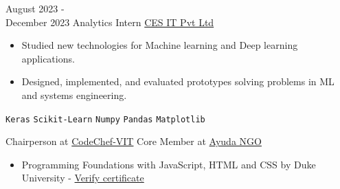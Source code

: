 \documentclass[9pt]{developercv}
\begin{document}
\vspace{-10 pt}
\begin{entrylist}
	\entry
        {August 2023 - \\
        December 2023}
		{Analytics Intern}
		{\href{https://www.cesltd.com/}{CES IT Pvt Ltd}}
		{\vspace{-10pt}
        \begin{itemize}[noitemsep,topsep=0pt,parsep=0pt,partopsep=0pt, leftmargin=-1pt]
            \item {Studied new technologies for Machine learning and Deep learning applications.}
            \item {Designed, implemented, and evaluated prototypes solving problems in ML and systems engineering.}
        \end{itemize} 
        \texttt{Keras} \slashsep \texttt{Scikit-Learn} \slashsep \texttt{Numpy} \slashsep \texttt{Pandas} \slashsep \texttt{Matplotlib}}
\end{entrylist}
\vspace{-10 pt}
    \vspace{-6pt}
    
    \hspace{26mm} Chairperson at \href{https://codechefvit.com/}{CodeChef-VIT} \hspace{20mm}Core Member at \href{https://ngoayuda.org/}{Ayuda NGO}


\vspace{5 pt}
    \vspace{-6pt}
    
    \begin{itemize}[noitemsep,topsep=0pt,parsep=0pt,partopsep=0pt, leftmargin=75pt]
            \item Programming Foundations with JavaScript, HTML and CSS by Duke University - \href{https://coursera.org/verify/ZZVTGPTSR36H}{Verify certificate}
    \end{itemize} 

\end{document}
